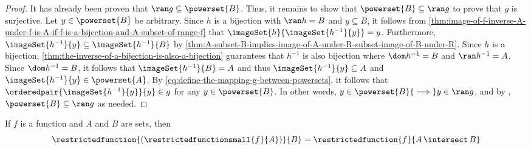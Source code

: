 \begin{proof}
    \vspace{0.1cm}
    \noindent
    It has already been proven that \( \ran g \subseteq \powerset{B} \). Thus, it remains to show that \( \powerset{B} \subseteq \ran g \)
    to prove that \( g \) is surjective. Let \( y \in \powerset{B} \) be arbitrary.
    Since \( h \) is a bijection with \( \ran h = B \) and \( y \subseteq B \),
    it follows from \cref{thm:image-of-f-inverse-A-under-f-is-A-if-f-is-a-bijection-and-A-subset-of-range-f} that
    \( \imageSet{h}{\imageSet{h^{-1}}{y}} = y \).
    Furthermore, \( \imageSet{h^{-1}}{y} \subseteq \imageSet{h^{-1}}{B} \) by
    \cref{thm:A-subset-B-implies-image-of-A-under-R-subset-image-of-B-under-R}.
    Since \( h \) is a bijection, \cref{thm:the-inverse-of-a-bijection-is-also-a-bijection} guarantees that \( h^{-1} \) is also
    bijection where \( \dom h^{-1} = B \) and \( \ran h^{-1} = A \). Since \( \dom h^{-1} = B \), it follows that \( \imageSet{h^{-1}}{B} = A \)
    and thus \( \imageSet{h^{-1}}{y} \subseteq A \) and \( \imageSet{h^{-1}}{y} \in \powerset{A} \).
    By \eqref{eq:define-the-mapping-g-between-powersets},
    it follows that \( \orderedpair{\imageSet{h^{-1}}{y}}{y} \in g \) for any \( y \in \powerset{B} \).
    In other words, \( y \in \powerset{B} {\implies} y \in \ran g \), and by ,
    \( \powerset{B} \subseteq \ran g \) as needed.
\end{proof}

\begin{thm}
     \label{thm:restricted-restricted-function-is-equal-to-the-original-function-restricted-to-the-intersection}
    If \( f \) is a function and \( A \) and \( B \) are sets, then
    \begin{equation*}
        \restrictedfunction{ ( \restrictedfunctionsmall{f}{A} ) }{B} = \restrictedfunction{f}{A \,{\intersect}\, B}
    \end{equation*}
\end{thm}


